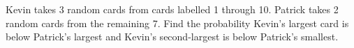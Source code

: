 Kevin takes 3 random cards from cards labelled 1 through 10. Patrick takes 2 random cards from the remaining 7. Find the probability Kevin's largest card is below Patrick's largest and Kevin's second-largest is below Patrick's smallest.
